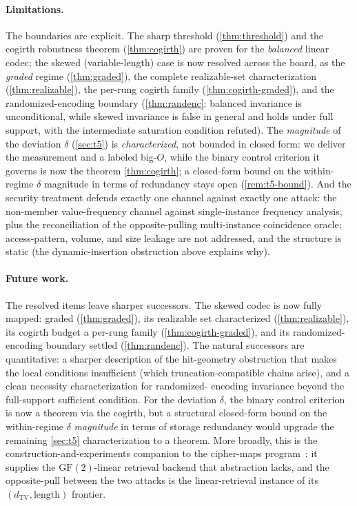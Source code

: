 \documentclass[acmsmall,review]{acmart}
\newcommand{\TV}{d_{\mathrm{TV}}}
\newcommand{\GF}{\mathrm{GF}(2)}
\begin{document}
\paragraph{Limitations.}
The boundaries are explicit. The sharp threshold (\cref{thm:threshold}) and the cogirth
robustness theorem (\cref{thm:cogirth}) are proven for the \emph{balanced} linear codec; the
skewed (variable-length) case is now resolved across the board, as the \emph{graded} regime
(\cref{thm:graded}), the complete realizable-set characterization (\cref{thm:realizable}), the
per-rung cogirth family (\cref{thm:cogirth-graded}), and the randomized-encoding boundary
(\cref{thm:randenc}: balanced invariance is unconditional, while skewed invariance is false in
general and holds under full support, with the intermediate saturation condition refuted). The \emph{magnitude} of the deviation
$\delta$ (\cref{sec:t5}) is \emph{characterized}, not bounded in closed form: we deliver the
measurement and a labeled big-$O$, while the binary control criterion it governs is now the
theorem \cref{thm:cogirth}; a closed-form bound on the within-regime $\delta$ magnitude in
terms of redundancy stays open (\cref{rem:t5-bound}). And the security treatment defends
exactly one channel against exactly one attack: the non-member value-frequency channel against
single-instance frequency analysis, plus the reconciliation of the opposite-pulling
multi-instance coincidence oracle; access-pattern, volume, and size leakage are not addressed,
and the structure is static (the dynamic-insertion obstruction above explains why).

\paragraph{Future work.}
The resolved items leave sharper successors. The skewed codec is now fully mapped: graded
(\cref{thm:graded}), its realizable set characterized (\cref{thm:realizable}), its cogirth
budget a per-rung family (\cref{thm:cogirth-graded}), and its randomized-encoding boundary
settled (\cref{thm:randenc}). The natural successors are quantitative: a sharper description of
the hit-geometry obstruction that makes the local conditions insufficient (which
truncation-compatible chains arise), and a clean necessity characterization for randomized-
encoding invariance beyond the full-support sufficient condition. For the
deviation $\delta$, the binary control criterion is now a theorem via the cogirth, but a
structural closed-form bound on the within-regime $\delta$ \emph{magnitude} in terms of storage
redundancy would upgrade the remaining \cref{sec:t5} characterization to a theorem. More
broadly, this is the construction-and-experiments companion to the cipher-maps
program~\cite{towell2026ciphermaps}: it supplies the $\GF$-linear retrieval backend that
abstraction lacks, and the opposite-pull between the two attacks is the linear-retrieval
instance of its $(\TV, \text{length})$ frontier.
\end{document}
